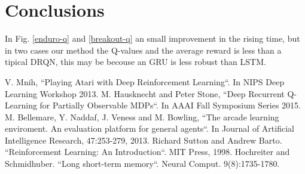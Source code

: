 \documentclass[conference]{IEEEtran}
\begin{document}
\section{Conclusions}

In Fig. \ref{enduro-q} and \ref{breakout-q} an small  improvement in the rising time, but in two cases our method the Q-values and the average reward is less than a tipical DRQN, this may be becouse an GRU is less robust than LSTM.



\begin{thebibliography}{00}
 V. Mnih, ``Playing Atari with Deep Reinforcement Learning``. In NIPS Deep Learning Workshop 2013.
 M. Hausknecht and Peter Stone, ``Deep Recurrent Q-Learning for Partially Observable MDPs``. In AAAI Fall Symposium Series 2015.
 M. Bellemare, Y. Naddaf, J. Veness and M. Bowling, ``The arcade learning enviroment. An evaluation platform for general agents``. In Journal of Artificial Intelligence Research, 47:253-279, 2013.
 Richard Sutton and Andrew Barto. ``Reinforcement Learning: An Introduction``. MIT Press, 1998.
 Hochreiter and Schmidhuber. ``Long short-term memory``. Neural Comput. 9(8):1735-1780.
\end{thebibliography}
\end{document}
